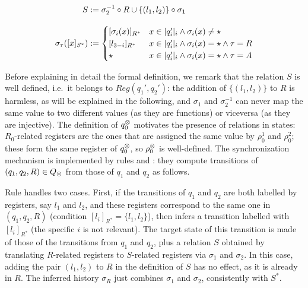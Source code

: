 \begin{definition}
	\begin{align*}
		S &:= \sigma_2^{-1} \circ R \cup \{(l_1,l_2)\} \circ \sigma_1 
		\\[2ex]
		\sigma_\tau([x]_{S^*}) &:= 
		\begin{cases}
			[\sigma_i(x)]_{R^*} & x \in |q'_i|_i \land \sigma_i(x) \neq \star \\
			[l_{3-i}]_{R^*} & x \in |q'_i|_i \land \sigma_i(x) = \star \land \tau = R \\
			\star & x \in |q'_i|_i \land \sigma_i(x) = \star \land \tau = A
		\end{cases}
	\end{align*}
\end{definition}
%
 Before explaining in detail the formal definition, we remark that the relation $S$ is well defined, i.e.\ it belongs to $Reg(q_1',q_2')$: the addition of $\{(l_1,l_2)\}$ to $R$ is harmless, as will be explained in the following, and $\sigma_1$ and $\sigma^{-1}_2$ can never map the same value to two different values (as they are functions) or viceversa (as they are injective).
%
The definition of $q_0^{\otimes}$ motivates the presence of relations in states: $R_0$-related registers are the ones that are assigned the same value by $\rho_0^1$ and $\rho_0^2$; these form the same register of $q_0^{\otimes}$, so $\rho_0^{\otimes}$ is well-defined. The synchronization mechanism is implemented by rules \regrule{} and \allrule{}: they compute transitions of $(q_1,q_2,R) \in Q_{\otimes}$ from those of $q_1$ and $q_2$ as follows.

Rule \regrule{} handles two cases. First, if the transitions of $q_1$ and $q_2$ are both labelled by registers, say $l_1$ and $l_2$, and these registers correspond to the same one in $(q_1,q_2,R)$ (condition $[l_i]_{R^*} = \{l_1,l_2\}$), then \regrule{} infers a transition labelled with $[l_i]_{R^*}$ (the specific $i$ is not relevant). The target state of this transition is made of those of the transitions from $q_1$ and $q_2$, plus a relation $S$ obtained by translating $R$-related registers to $S$-related registers via $\sigma_1$ and $\sigma_2$. In this case, adding the pair $(l_1,l_2)$ to $R$ in the definition of $S$ has no effect, as it is already in $R$. The inferred history $\sigma_R$ just combines $\sigma_1$ and $\sigma_2$, consistently with $S^*$.

